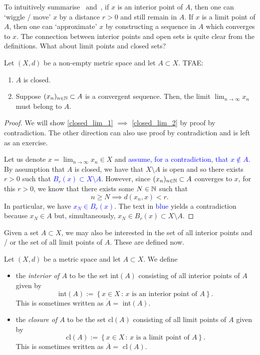 To intuitively summarise~ and~, if $x$ is an interior point of $A$, then one can `wiggle / move' $x$ by a distance $r>0$ and still remain in $A$. If $x$ is a limit point of $A$, then one can `approximate' $x$ by constructing a sequence in $A$ which converges to $x$. The connection between interior points and open sets is quite clear from the definitions. What about limit points and closed sets?
\begin{lemma}
\label{lem:closed_lim}
Let $(X,d)$ be a non-empty metric space and let $A\subset X$. TFAE:
\begin{enumerate}
	\item \label{closed_lim_1} $A$ is closed.
	\item \label{closed_lim_2} Suppose $(x_n)_{n\in\mathbb{N}}\subset A$ is a convergent sequence. Then, the limit $\lim_{n\to \infty}x_n$ must belong to $A$.
\end{enumerate}
\end{lemma}
\begin{proof}
We will show \ref{closed_lim_1} $\implies$ \ref{closed_lim_2} by proof by contradiction. The other direction can also use proof by contradiction and is left as an exercise.

Let us denote $x = \lim_{n\to \infty} x_n \in X$ and \textcolor{blue}{assume, for a contradiction, that $x \notin A$.} By assumption that $A$ is closed, we have that $X\setminus A$ is open and so there exists $r>0$ such that \textcolor{blue}{$B_r(x) \subset X\setminus A$}. However, since $(x_n)_{n\in\mathbb{N}}\subset A$ converges to $x$, for this $r>0$, we know that there exists some $N\in\mathbb{N}$ such that
\[
n\ge N \implies d(x_n,x)<r.
\]
In particular, we have \textcolor{blue}{$x_N \in B_r(x)$}. The text in \textcolor{blue}{blue} yields a contradiction because $x_N \in A$ but, simultaneously, $x_N \in B_r(x) \subset X\setminus A$.
\end{proof}
Given a set $A\subset X$, we may also be interested in the set of all interior points and / or the set of all limit points of $A$. These are defined now.
\begin{defn}
	\label{defn:int_clos}
	Let $(X,d)$ be a metric space and let $A\subset X$. We define
	\begin{itemize}
		\item the \textit{interior of $A$} to be the set int$(A)$ consisting of all interior points of $A$ given by
		\[
		\text{int}(A) := \left\{
		x\in X \, : \, x\text{ is an interior point of }A
		\right\}.
		\]
		This is sometimes written as $\mathring{A} = $ int$(A)$.
		\item the \textit{closure of $A$} to be the set cl$(A)$ consisting of all limit points of $A$ given by
		\[
		\text{cl}(A):= \left\{
		x\in X \, : \, x\text{ is a limit point of }A
		\right\}.
		\]
		This is sometimes written as $\overline{A} = $ cl$(A)$.
	\end{itemize}
\end{defn}
